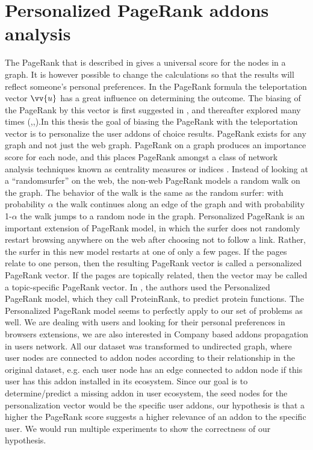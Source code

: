 \documentclass[11pt,oneside]{book}
\let\Oldsection\section
\renewcommand{\section}{\FloatBarrier\Oldsection}
\begin{document}
\section{Personalized PageRank addons analysis}
\label{sec:PPR_addons_method}
The PageRank that is described in \citep{page1999pagerank} gives a universal score for the nodes in a graph. It is however possible to change the calculations so that the results will reflect someone’s personal preferences. In the PageRank formula the teleportation vector $\vv{u}$ has a great influence on determining the outcome. The biasing of the PageRank by this vector is first suggested in \citep{brin1998can}, and thereafter explored many times (\citep{haveliwala2002topic},\citep{haveliwala2003topic},\citep{haveliwala2003analytical}).In this thesis the goal of biasing the PageRank with the teleportation vector is to personalize the user addons of choice results. PageRank exists for any graph and not just the web graph. PageRank on a graph produces an importance score for each node, and this places PageRank amongst a class of network analysis techniques \citep{brandes2005network} known as centrality measures or indices \citep{koschutzki2005centrality}.
Instead of looking at a “randomsurfer” on the web, the non-web PageRank models a random walk on the graph. The behavior of the walk is the same as the random surfer: with probability $\alpha$ the walk continues along an edge
of the graph and with probability 1-$\alpha$ the walk jumps to a random node in the graph. Personalized PageRank is an important extension of PageRank model, in which the surfer does not randomly restart browsing anywhere on the web after choosing not to follow a link. Rather, the surfer in this new model restarts at one of only a few pages. If the pages relate to one person, then the resulting PageRank vector is called a personalized PageRank vector. If the pages are topically related, then the vector may be called a topic-specific PageRank vector.
In \citep{freschi2007protein}, the authors used the Personalized PageRank model, which they call ProteinRank, to predict protein functions. The Personalized PageRank model seems to perfectly apply to our set of problems as well. We are dealing with users and looking for their personal preferences in browsers extensions, we are also interested in Company based addons propagation in users network. All our dataset was transformed to undirected graph, where user nodes are connected to addon nodes according to their relationship in the original dataset, e.g. each user node has an edge connected to addon node if this user has this addon installed in its ecosystem. Since our goal is to determine/predict a missing addon in user ecosystem, the seed nodes for the personalization vector would be the specific user addons, our hypothesis is that a higher the PageRank score suggests a higher relevance of an addon to the specific user. We would run multiple experiments to show the correctness of our hypothesis.
\end{document}
